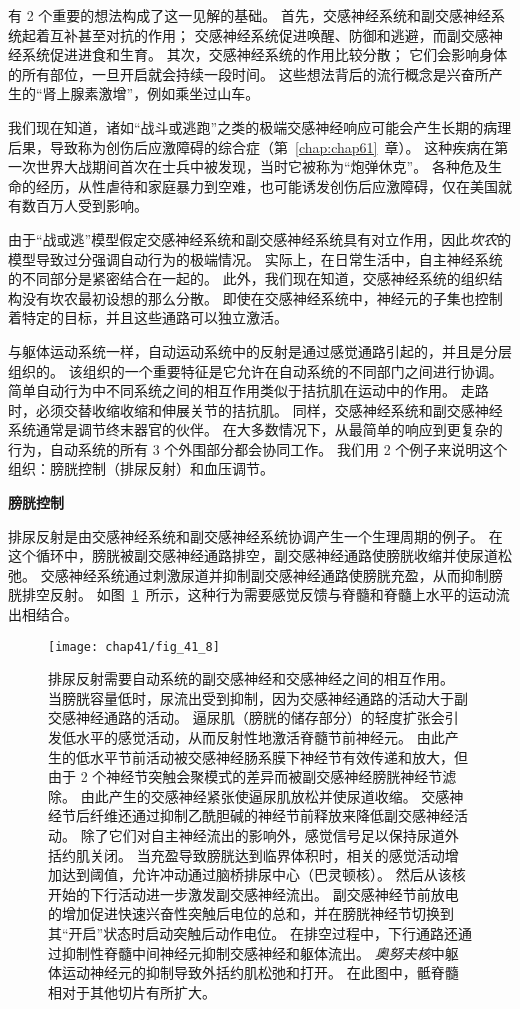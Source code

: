 有 2 个重要的想法构成了这一见解的基础。
首先，交感神经系统和副交感神经系统起着互补甚至对抗的作用；
交感神经系统促进唤醒、防御和逃避，而副交感神经系统促进进食和生育。
其次，交感神经系统的作用比较分散；
它们会影响身体的所有部位，一旦开启就会持续一段时间。
这些想法背后的流行概念是兴奋所产生的“肾上腺素激增”，例如乘坐过山车。


我们现在知道，诸如“战斗或逃跑”之类的极端交感神经响应可能会产生长期的病理后果，导致称为创伤后应激障碍的综合症（第~\ref{chap:chap61}~章）。
这种疾病在第一次世界大战期间首次在士兵中被发现，当时它被称为“炮弹休克”。
各种危及生命的经历，从性虐待和家庭暴力到空难，也可能诱发创伤后应激障碍，仅在美国就有数百万人受到影响。


由于“战或逃”模型假定交感神经系统和副交感神经系统具有对立作用，因此\textit{坎农}的模型导致过分强调自动行为的极端情况。
实际上，在日常生活中，自主神经系统的不同部分是紧密结合在一起的。
此外，我们现在知道，交感神经系统的组织结构没有坎农最初设想的那么分散。
即使在交感神经系统中，神经元的子集也控制着特定的目标，并且这些通路可以独立激活。


与躯体运动系统一样，自动运动系统中的反射是通过感觉通路引起的，并且是分层组织的。
该组织的一个重要特征是它允许在自动系统的不同部门之间进行协调。
简单自动行为中不同系统之间的相互作用类似于拮抗肌在运动中的作用。
走路时，必须交替收缩收缩和伸展关节的拮抗肌。
同样，交感神经系统和副交感神经系统通常是调节终末器官的伙伴。
在大多数情况下，从最简单的响应到更复杂的行为，自动系统的所有 3 个外围部分都会协同工作。
我们用 2 个例子来说明这个组织：膀胱控制（排尿反射）和血压调节。


\textbf{膀胱控制}

排尿反射是由交感神经系统和副交感神经系统协调产生一个生理周期的例子。
在这个循环中，膀胱被副交感神经通路排空，副交感神经通路使膀胱收缩并使尿道松弛。
交感神经系统通过刺激尿道并抑制副交感神经通路使膀胱充盈，从而抑制膀胱排空反射。
如图~\ref{fig:41_8}~所示，这种行为需要感觉反馈与脊髓和脊髓上水平的运动流出相结合。


\begin{figure}[htbp]
	\centering
	\texttt{[image: chap41/fig\_41\_8]}
	\caption{排尿反射需要自动系统的副交感神经和交感神经之间的相互作用\cite{de1993neurophysiology}。
		当膀胱容量低时，尿流出受到抑制，因为交感神经通路的活动大于副交感神经通路的活动。
		逼尿肌（膀胱的储存部分）的轻度扩张会引发低水平的感觉活动，从而反射性地激活脊髓节前神经元。
		由此产生的低水平节前活动被交感神经肠系膜下神经节有效传递和放大，但由于 2 个神经节突触会聚模式的差异而被副交感神经膀胱神经节滤除。
		由此产生的交感神经紧张使逼尿肌放松并使尿道收缩。
		交感神经节后纤维还通过抑制乙酰胆碱的神经节前释放来降低副交感神经活动。
		除了它们对自主神经流出的影响外，感觉信号足以保持尿道外括约肌关闭。
		当充盈导致膀胱达到临界体积时，相关的感觉活动增加达到阈值，允许冲动通过脑桥排尿中心（巴灵顿核）。
		然后从该核开始的下行活动进一步激发副交感神经流出。
		副交感神经节前放电的增加促进快速兴奋性突触后电位的总和，并在膀胱神经节切换到其“开启”状态时启动突触后动作电位。
		在排空过程中，下行通路还通过抑制性脊髓中间神经元抑制交感神经和躯体流出。
		\textit{奥努夫核}中躯体运动神经元的抑制导致外括约肌松弛和打开。
		在此图中，骶脊髓相对于其他切片有所扩大。}
	\label{fig:41_8}
\end{figure}


